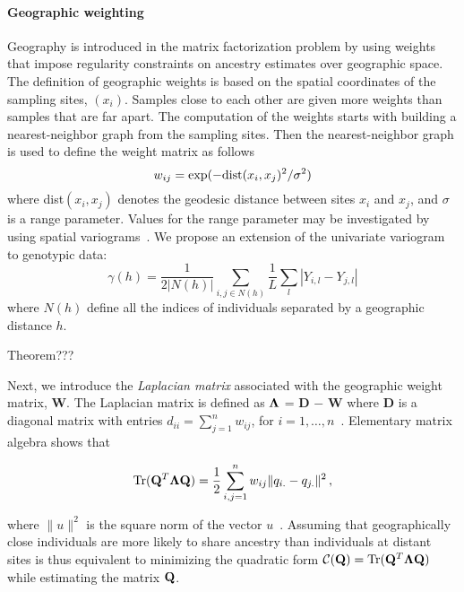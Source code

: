  \paragraph{Geographic weighting} Geography is introduced in the matrix factorization problem by using weights that impose regularity constraints on ancestry estimates over geographic space. The definition of geographic weights is based on the spatial coordinates of the sampling sites, $(x_i)$. Samples close to each other are given more weights than samples that are far apart. The computation of the weights starts with building a nearest-neighbor graph from the sampling sites. Then the nearest-neighbor graph is used to define the weight matrix as follows
$$
w_{ij} = \exp( - {\rm dist}( x_i, x_j )^2/ \sigma^2)
$$
\noindent where dist$( x_i, x_j )$ denotes the geodesic distance between sites $x_i$ and  $x_j$, and $\sigma$ is a range parameter. Values for the range parameter may be investigated by using spatial variograms~\citep{Cressie1993}. We propose an extension of the univariate variogram to genotypic data:
$$
\gamma(h) = \frac{1}{2 |N(h)|} \sum_{i,j \in N(h)} \frac{1}{L} \sum_{l} |Y_{i,l} - Y_{j,l}|
$$
\noindent where $N(h)$ define all the indices of individuals separated by a geographic distance $h$. 

Theorem???


Next, we introduce the {\it Laplacian matrix} associated with the geographic weight matrix, {\bf W}. The Laplacian matrix is defined as ${\bf \Lambda}$ =  {\bf D} $-$ {\bf W}  where  {\bf D} is a diagonal matrix with entries 
$d_{ii} = \sum_{j = 1}^n w_{ij}$,  for  $i = 1, \dots, n$~\citep{Belkin2003}. Elementary matrix algebra shows that 

$$
 {\rm Tr} ({\bf Q}^T {\bf \Lambda} {\bf Q})  = \frac12 \sum_{i,j = 1}^n  w_{ij}  \|   q_{i.}  - q_{j.} \|^2 \, ,
$$

 \noindent  where $\|  u \|^2$ is the square norm of the vector $u$~\citep{DengCai2011}. Assuming that geographically close individuals are more likely to share ancestry than individuals at distant sites  is thus equivalent to minimizing the quadratic form ${\cal C}({\bf Q}) ={\rm Tr} ({\bf Q}^T {\bf \Lambda} {\bf Q})$ while estimating the matrix ${\bf Q}$. 

